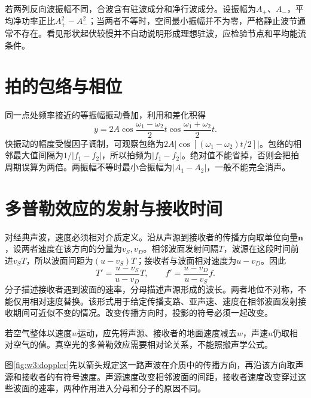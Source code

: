 若两列反向波振幅不同，合波含有驻波成分和净行波成分。设振幅为$A_+$、$A_-$，平均净功率正比$A_+^2-A_-^2$；当两者不等时，空间最小振幅并不为零，严格静止波节通常不存在。看见形状起伏较慢并不自动说明形成理想驻波，应检验节点和平均能流条件。


\section{拍的包络与相位}
同一点处频率接近的等振幅振动叠加，利用和差化积得
\[
y=2A\cos\frac{\omega_1-\omega_2}{2}t
       \cos\frac{\omega_1+\omega_2}{2}t.
\]
快振动的幅度受慢因子调制，可观察包络为$2A|\cos[(\omega_1-\omega_2)t/2]|$。包络的相邻最大值间隔为$1/|f_1-f_2|$，所以拍频为$|f_1-f_2|$。绝对值不能省掉，否则会把拍周期误算为两倍。两振幅不等时最小合振幅为$|A_1-A_2|$，一般不能完全消声。



\section{多普勒效应的发射与接收时间}
对经典声波，速度必须相对介质定义。沿从声源到接收者的传播方向取单位向量$\boldsymbol n$，设两者速度在该方向的分量为$v_S,v_D$。相邻波面发射间隔$T$，波源在这段时间前进$v_ST$，所以波面间距为$(u-v_S)T$；接收者与波面相对速度为$u-v_D$。因此
\[
T'=\frac{u-v_S}{u-v_D}T,\qquad
f'=\frac{u-v_D}{u-v_S}f.
\]
分子描述接收者遇到波面的速率，分母描述声源形成的波长。两者地位不对称，不能仅用相对速度替换。该形式用于给定传播支路、亚声速、速度在相邻波面发射接收期间可近似不变的情况。改变传播方向时，投影的符号必须一起改变。

若空气整体以速度$w$运动，应先将声源、接收者的地面速度减去$w$，声速$u$仍取相对空气的值。真空光的多普勒效应需要相对论关系，不能照搬声学公式。


图\ref{fig:w3:doppler}先以箭头规定这一路声波在介质中的传播方向，再沿该方向取声源和接收者的有符号速度。声源速度改变相邻波面的间距，接收者速度改变穿过这些波面的速率，两种作用进入分母和分子的原因不同。

